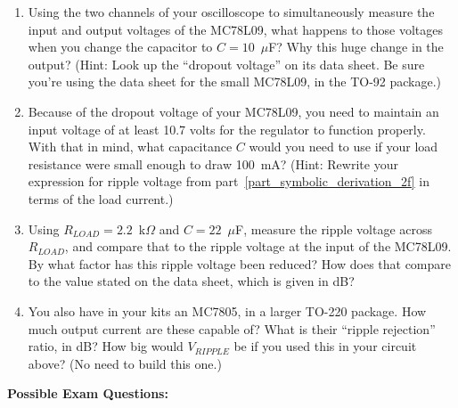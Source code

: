 \begin{enumerate}[wide]
\item Using the two channels of your oscilloscope to simultaneously measure the input and output voltages of the MC78L09, what happens to those voltages when you change the capacitor to $C = 10$~$\mu$F?  Why this huge change in the output?  (Hint: Look up the ``dropout voltage'' on its data sheet.  Be sure you're using the data sheet for the small MC78L09, in the TO-92 package.)

\item Because of the dropout voltage of your MC78L09, you need to maintain an input voltage of at least 10.7 volts for the regulator to function properly.  With that in mind, what capacitance $C$ would you need to use if your load resistance were small enough to draw 100~mA?   (Hint: Rewrite your expression for ripple voltage from part~\ref{part_symbolic_derivation_2f} in terms of the load current.)

\item Using $R_{LOAD} = 2.2$~k$\Omega$ and $C = 22$~$\mu$F, measure the ripple voltage across $R_{LOAD}$, and compare that to the ripple voltage at the input of the MC78L09.  By what factor has this ripple voltage been reduced?  How does that compare to the value stated on the data sheet, which is given in dB?

\item You also have in your kits an MC7805, in a larger TO-220 package.  How much output current are these capable of?  What is their ``ripple rejection'' ratio, in dB?  How big would $V_{RIPPLE}$ be if you used this in your circuit above?  (No need to build this one.)

\end{enumerate}

\textbf{Possible Exam Questions:}


